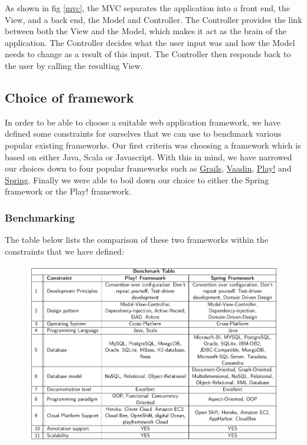 As shown in fig \ref{mvc}, the MVC separates the application into a front end, the View, and a back end, the Model and Controller. The Controller provides the link between both the View and the Model, which makes it act as the brain of the application. The Controller decides what the user input was and how the Model needs to change as a result of this input\cite{codinghorror}. The Controller then responds back to the user by calling the resulting View.

\subsection{Choice of framework}
In order to be able to choose a suitable web application framework, we have defined some  constraints for ourselves that we can use to benchmark various popular existing frameworks. Our first criteria was choosing a framework which is based on either Java, Scala or Javascript. With this in mind, we have narrowed our choices down to four popular frameworks such as \href{https://grails.org/}{Grails}, \href{https://vaadin.com/home}{Vaadin}, \href{https://www.playframework.com/}{Play!} and \href{http://projects.spring.io/spring-framework/}{Spring}. Finally we were able to boil down our choice to either the Spring framework or the Play! framework.
\subsubsection{Benchmarking}
 The table below lists the comparison of these two frameworks within the constraints that we have defined:\\

\begin{figure}[h]
\centering
\includegraphics[scale=0.5]{./img/benchmark.png}	
\end{figure}

